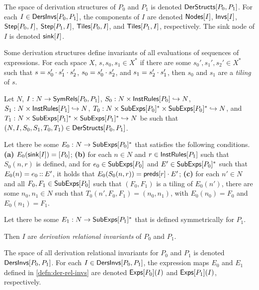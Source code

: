 %
The space of derivation structures of $P_0$ and $P_1$ is denoted
$\mathsf{DerStructs}[ P_0, P_1 ]$.
%
For each $I \in \mathsf{DersInvs}[ P_0, P_1 ]$, the components of $I$ are
denoted $\mathsf{Nodes}[ I ]$, $\mathsf{Invs}[ I ]$, $\mathsf{Step}[ P_0, I ]$,
$\mathsf{Step}[ P_1, I ]$, $\mathsf{Tiles}[ P_0, I ]$, and $\mathsf{Tiles}[ P_1, I ]$,
respectively.
%
The sink node of $I$ is denoted $\mathsf{sink}[ I ]$.

Some derivation structures define invariants of all evaluations of
sequences of expressions.
%
For each space $X$, $s, s_0, s_1 \in X^{*}$ if there are some $s_0',
s_1', s_2' \in X^{*}$ such that $s = s_0' \cdot s_1' \cdot s_2'$,
$s_0 = s_0' \cdot s_2'$, and $s_1 = s_2' \cdot s_1'$, then $s_0$
and $s_1$ are a \emph{tiling} of $s$.
%
\begin{defn}
  \label{defn:der-rel-invs}
  Let $N$, $I : N \to \mathsf{SymRels}[ P_0, P_1 ]$, %
  $S_0 : N \times \mathsf{InstRules}[ P_0 ] \hookrightarrow N$, %
  $S_1 : N \times \mathsf{InstRules}[ P_1 ] \hookrightarrow N$, %
  $T_0 : N \times \mathsf{SubExps}[ P_0 ]^{*} \times \mathsf{SubExps}[ P_0 ]^{*} \hookrightarrow
  N$, and %
  $T_1 : N \times \mathsf{SubExps}[ P_1 ]^{*} \times \mathsf{SubExps}[ P_1 ]^{*} \hookrightarrow
  N$ be such that $(N, I, S_0, S_1, T_0, T_1) \in
  \mathsf{DerStructs}[ P_0, P_1 ]$.

  Let there be some $E_0 : N \to \mathsf{SubExps}[ P_0 ]^{*}$ that satisfies the
  following conditions.
  \textbf{(a)} $E_0(\mathsf{sink}[ I ]) = [ P_0 ]$;
  \textbf{(b)} for each $n \in N$ and $r \in \mathsf{InstRules}[ P_1 ]$ such
  that $S_0(n, r)$ is defined, and for $e_0 \in \mathsf{SubExps}[ P_0 ]$ and $E'
  \in \mathsf{SubExps}[ P_0 ]^{*}$ such that $E_0(n) = e_0 \mathbin{::} E'$, it holds
  that $E_0( S_0(n, r) ) = \mathsf{preds}[ r ] \cdot E'$;
  \textbf{(c)} for each $n' \in N$ and all $F_0, F_1 \in
  \mathsf{SubExps}[ P_0 ]$ such that $(F_0, F_1)$ is a tiling of $E_0(n')$,
  there are some $n_0, n_1 \in N$ such that $T_0(n', F_0, F_1) = (n_0,
  n_1)$, with $E_0(n_0) = F_0$ and $E_0(n_1) = F_1$.

  Let there be some $E_1 : N \to \mathsf{SubExps}[ P_1 ]^{*}$ that is defined
  symmetrically for $P_1$.

  Then $I$ are \emph{derivation relational invariants} of $P_0$ and
  $P_1$.
\end{defn}
%
The space of all derivation relational invariants for $P_0$ and $P_1$
is denoted $\mathsf{DersInvs}[ P_0, P_1 ]$.
%
For each $I \in \mathsf{DersInvs}[ P_0, P_1 ]$, the expression maps $E_0$ and
$E_1$ defined in \autoref{defn:der-rel-invs} are denoted
$\mathsf{Exps}[ P_0 ]( I )$ and $\mathsf{Exps}[ P_1 ]( I )$, respectively.
%

